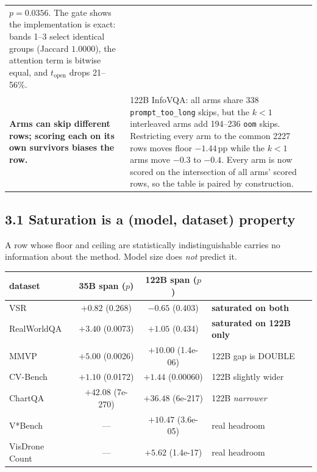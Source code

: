 \documentclass[10pt]{article}
\newcommand{\hh}[1]{\textbf{#1}}
\begin{document}
\begin{table}[h]
\begin{tabular}{p{}p{}}
$p{=}0.0356$. The gate shows the implementation is exact: bands 1--3 select identical groups
(Jaccard $1.0000$), the attention term is bitwise equal, and $t_{\text{open}}$ drops 21--56\%. \\
\addlinespace
\hh{Arms can skip different rows; scoring each on its own survivors biases the row.} &
122B InfoVQA: all arms share 338 \texttt{prompt\_too\_long} skips, but the $k{<}1$ interleaved arms
add 194--236 \texttt{oom} skips. Restricting every arm to the common 2227 rows moves floor
$-1.44$\,pp while the $k{<}1$ arms move $-0.3$ to $-0.4$. Every arm is now scored on the
intersection of all arms' scored rows, so the table is paired by construction. \\
\bottomrule
\end{tabular}
\end{table}

\subsection*{3.1 Saturation is a (model, dataset) property}

A row whose floor and ceiling are statistically indistinguishable carries no information about the
method. Model size does \emph{not} predict it.

\begin{table}[h]\centering\small
\begin{tabular}{lccl}
\toprule
dataset & 35B span ($p$) & 122B span ($p$) & \\
\midrule
VSR            & $+0.82$ (0.268)      & $-0.65$ (0.403)      & \hh{saturated on both} \\
RealWorldQA    & $+3.40$ (0.0073)     & $+1.05$ (0.434)      & \hh{saturated on 122B only} \\
MMVP           & $+5.00$ (0.0026)     & $+10.00$ (1.4e-06)   & 122B gap is DOUBLE \\
CV-Bench       & $+1.10$ (0.0172)     & $+1.44$ (0.00060)    & 122B slightly wider \\
ChartQA        & $+42.08$ (7e-270)    & $+36.48$ (6e-217)    & 122B \emph{narrower} \\
V*Bench        & ---                  & $+10.47$ (3.6e-05)   & real headroom \\
VisDrone Count & ---                  & $+5.62$ (1.4e-17)    & real headroom \\
\bottomrule
\end{tabular}
\end{table}
\end{document}
